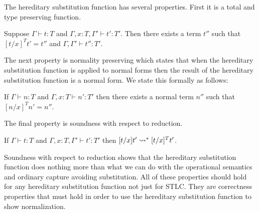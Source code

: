 \documentclass{article}
\begin{document}
The hereditary substitution function has several properties.  First
it is a total and type preserving function.
\begin{lemma}
  \label{lemma:total}
  Suppose $\Gamma \vdash t : T$ and $\Gamma, x:T, \Gamma' \vdash t':T'$. Then
  there exists a term $t''$ such that $[t/x]^T t' = t''$ and $\Gamma,\Gamma' \vdash t'':T'$.
\end{lemma}
\noindent
The next property is normality preserving which states that when the
hereditary substitution function is applied to normal forms then the
result of the hereditary substitution function is a normal form.  We state
this formally as follows:
\begin{lemma}
  \label{corollary:normalization_preserving}
  If $\Gamma \vdash n:T$ and $\Gamma, x:T \vdash n':T'$ then there exists a normal term $n''$ 
  such that $[n/x]^T n' = n''$.
\end{lemma}
\noindent
The final property is soundness with respect to reduction. 
\begin{lemma}
  \label{lemma:soundness_reduction}
  If $\Gamma \vdash t : T$ and $\Gamma, x:T, \Gamma' \vdash t':T'$ then
  $[t/x]t' \rightsquigarrow^* [t/x]^T t'$.
\end{lemma}
\noindent
Soundness with respect to reduction shows that the hereditary
substitution function does nothing more than what we can do with the
operational semantics and ordinary capture avoiding substitution.  All
of these properties should hold for any hereditary substitution
function not just for STLC.  They are correctness properties that must
hold in order to use the hereditary substitution function to show
normalization.
\end{document}
